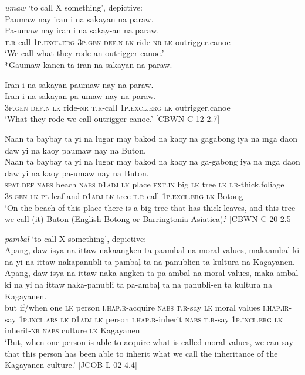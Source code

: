 \ea
\textit{umaw} ‘to call X something’, depictive: \\
Paumaw	nay	iran	i	na	sakayan	na	paraw. \\\smallskip
\gll Pa-umaw	nay	iran	i	na	sakay-an	na	paraw. \\
\textsc{t.r}-call	1\textsc{p.excl.erg}	3\textsc{p.gen}	\textsc{def.n}	\textsc{lk}	ride-\textsc{nr}	\textsc{lk}	outrigger.canoe \\
\glt ‘We call what they rode an outrigger canoe.’ \\\smallskip
*Gaumaw kanen ta iran na sakayan na paraw.
\z

\ea
Iran	i	na	sakayan	paumaw	nay	na	paraw. \\\smallskip
\gll Iran	i	na	sakayan	pa-umaw	nay	na	paraw. \\
3\textsc{p.gen}	\textsc{def.n}	\textsc{lk}	ride-\textsc{nr}	\textsc{t.r}-call	1\textsc{p.excl.erg}	\textsc{lk}	outrigger.canoe \\
\glt ‘What they rode we call outrigger canoe.’ [CBWN-C-12 2.7]
\z

\ea
Naan	ta	baybay	ta	yi	na	lugar	may	bakod	na	kaoy	na	gagabong iya	na	mga	daon	daw	yi	na	kaoy	paumaw	nay	na	Buton. \\\smallskip
\gll Naan	ta	baybay	ta	yi	na	lugar	may	bakod	na	kaoy	na	ga-gabong iya	na	mga	daon daw	yi	na	kaoy	pa-umaw	nay	na	Buton. \\
\textsc{spat.def}	\textsc{nabs}	beach	\textsc{nabs}	\textsc{d1adj}	\textsc{lk}	place	\textsc{ext.in}	big	\textsc{lk}	tree	\textsc{lk}	\textsc{i.r}-thick.foliage
3\textsc{s.gen}	\textsc{lk}	\textsc{pl}	leaf	and	\textsc{d1adj}	\textsc{lk}	tree	\textsc{t.r}-call	1\textsc{p.excl.erg}	\textsc{lk}	Botong \\
\glt ‘On the beach of this place there is a big tree that has thick leaves, and this tree we call (it) Buton (English Botong or Barringtonia Asiatica).’ [CBWN-C-20 2.5]
\z

\ea
\textit{pambaļ} ‘to call X something’, depictive: \\
Apang,	daw	isya	na	ittaw	nakaangken	ta	paambaļ	na	moral values, makaambaļ	ki	na	yi	na	ittaw	nakapanubli	ta	pambaļ ta	na	panublien	ta	kultura	na	Kagayanen. \\\smallskip
\gll Apang,	daw	isya	na	ittaw	naka-angken	ta	pa-ambaļ	na	moral values, maka-ambaļ	ki	na	yi	na	ittaw	naka-panubli	ta	pa-ambaļ ta	na	panubli-en	ta	kultura	na	Kagayanen. \\
but	if/when	one	\textsc{lk}	person	\textsc{i.hap.r}-acquire	\textsc{nabs}	\textsc{t.r}-say	\textsc{lk}	moral values \textsc{i.hap.ir}-say	1\textsc{p.incl.abs}	\textsc{lk}	\textsc{d1adj}	\textsc{lk}	person	\textsc{i.hap.r}-inherit	\textsc{nabs}	\textsc{t.r}-say 1\textsc{p.incl.erg}	\textsc{lk}	inherit-\textsc{nr}	\textsc{nabs}	culture	\textsc{lk}	Kagayanen \\
\glt ‘But, when one person is able to acquire what is called moral values, we can say that this person has been able to inherit what we call the inheritance of the Kagayanen culture.’ [JCOB-L-02 4.4]
\z

